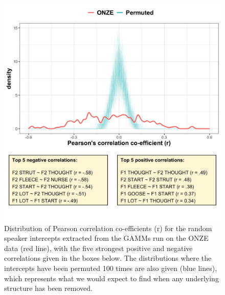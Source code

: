 \documentclass[review]{elsarticle} %
\begin{document}
\begin{figure}[!t]
\includegraphics[width=\textwidth]{Figures/correlations_permuted_plot.png}
\caption{Distribution of Pearson correlation co-efficients (r) for the random speaker intercepts extracted from the GAMMs run on the ONZE data (red line), with the five strongest positive and negative correlations given in the boxes below. The distributions where the intercepts have been permuted 100 times are also given (blue lines), which represents what we would expect to find when any underlying structure has been removed.}
\label{fig:correlations}
\end{figure}

\end{document}
